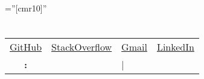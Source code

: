 \documentclass[a4paper,10pt]{article} %
\begin{document}
\pagestyle{empty} %

\font\fb=''[cmr10]'' %


\par{\bigskip\par} %

\section{\personalDataSection}

\begin{tabular}{clll}

	\faGithub \thinspace \href{https://github.com/Yuri-M-Dias}{GitHub}
	& \faStackOverflow \thinspace \href{http://stackoverflow.com/users/story/3312701}{StackOverflow}
	& \faEnvelopeO \thinspace \href{mailto:yurimathe.yp@gmail.com}{Gmail}
	& \faLinkedin \thinspace \href{https://www.linkedin.com/in/yuri-pereira-b5b589a8/}{LinkedIn} \\

	\bf \objectives: & \juniorDeveloper & | \softwareEngineer & \\
\end{tabular}


\section{\workExperienceSection}
\end{document}
